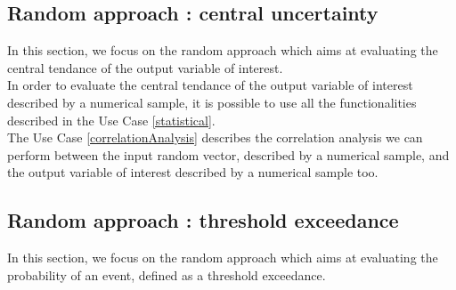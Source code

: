 
\newpage 
\newpage 
\newpage 
\newpage 
\newpage 
\newpage 


\newpage \subsection{Random approach : central uncertainty}
In this section, we focus on the random approach which aims at evaluating the central tendance of the output variable of interest.\\

In order to evaluate the central tendance of the output variable of interest described by a numerical sample, it is possible to use all the functionalities described in the  Use Case \ref{statistical}.\\

The Use Case  \ref{correlationAnalysis} describes the correlation analysis we can perform between the input random  vector, described by a numerical sample, and the output variable of interest described by a numerical sample too.


\newpage 
\newpage 
\newpage 
\newpage 
\newpage 



\newpage \subsection{Random approach : threshold exceedance}

In this section, we focus on the random approach which aims at evaluating the probability of an event, defined as a threshold exceedance.


\newpage 
\newpage 
\newpage 
\newpage 
\newpage 
\newpage 
\newpage 
\newpage 
\newpage 



